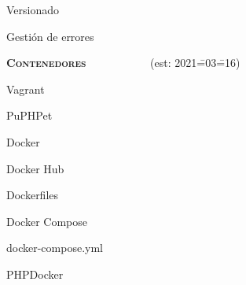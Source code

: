 \begin{longenum}
\begin{longenum}
        \item Versionado
        \item Gestión de errores
    \end{longenum}
    \item \textbf{\textsc{Contenedores}} \ \ \ \ \ \ \ \ \opcional\ \ \ (est: 2021\==03\==16)
    \begin{longenum}
        \item Vagrant
        \begin{longenum}
            \item PuPHPet
        \end{longenum}
        \item Docker
        \begin{longenum}
            \item Docker Hub
            \item Dockerfiles
            \item Docker Compose
            \begin{longenum}
                \item docker-compose.yml
            \end{longenum}
        \end{longenum}
        \item PHPDocker
    \end{longenum}
\end{longenum}

